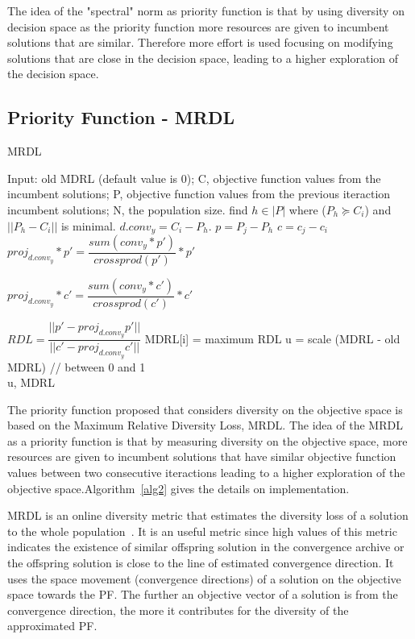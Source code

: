 The idea of the "spectral" norm as priority function is that by using diversity on decision space as the priority function more resources are given to incumbent solutions that are similar. Therefore more effort is used focusing on modifying solutions that are close in the decision space, leading to a higher exploration of the decision space.


\subsection{Priority Function - MRDL} 


\begin{algorithm}[t]
	\caption{MRDL}\label{alg2}
	\begin{algorithmic}[1]
		
		\State Input: old MDRL (default value is 0); C, objective function values from the incumbent solutions; P, objective function values from the previous iteraction incumbent solutions; N, the population size.
		\State find $h \in |P|$ where  ($P_h \succeq C_i$) and $||P_h - C_i  ||$ is minimal.
		\State $d.conv_{y} = C_i - P_h$.
		\State $p = P_j - P_h$
		\State $c = c_j - c_i$
		\State $proj_{d.conv_{y}}*p \prime = \dfrac{sum(conv_{y}*p \prime)}{crossprod(p \prime)}*p \prime$
		
		\State $ proj_{d.conv_{y}}*c \prime = \dfrac{sum(conv_{y}*c \prime)}{crossprod(c \prime)}*c \prime$
		
		\State $RDL = \dfrac{ ||p \prime - proj_{d.conv_{y}}p \prime|| }{||c \prime - proj_{d.conv_{y}}c \prime||}            $
		\EndFor
		MDRL[i] = maximum RDL
		\EndFor
		\State u = scale (MDRL - old MDRL) // between 0 and 1\\
	\Return u, MDRL
	\end{algorithmic}
\end{algorithm}

The priority function proposed that considers diversity on the objective space is based on the Maximum Relative Diversity Loss, MRDL. The idea of the MRDL as a priority function is that by measuring diversity on the objective space, more resources are given to incumbent solutions that have similar objective function values between two consecutive iteractions leading to a higher exploration of the objective space.Algorithm~\ref{alg2} gives the details on implementation.
 
 MRDL is an online diversity metric that estimates the diversity loss of a solution to the whole population~\cite{gee2015online}. It is an useful metric since high values of this metric indicates the existence of similar offspring solution in the convergence archive or the offspring solution is close to the line of estimated convergence direction. It uses the space movement (convergence directions) of a solution on the objective space towards the PF. The further an objective vector of a solution is from the convergence direction, the more it contributes for the diversity of the approximated PF. 

